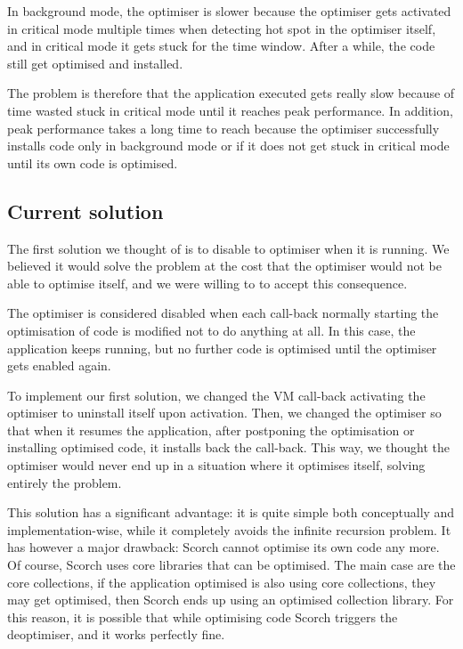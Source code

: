 \documentclass[a4paper,12pt,twoside]{../includes/ThesisStyle}
\begin{document}
In background mode, the optimiser is slower because the optimiser gets activated in critical mode multiple times when detecting hot spot in the optimiser itself, and in critical mode it gets stuck for the time window. After a while, the code still get optimised and installed. 

The problem is therefore that the application executed gets really slow because of time wasted stuck in critical mode until it reaches peak performance. In addition, peak performance takes a long time to reach because the optimiser successfully installs code only in background mode or if it does not get stuck in critical mode until its own code is optimised. 

\subsection{Current solution}

The first solution we thought of is to disable to optimiser when it is running. We believed it would solve the problem at the cost that the optimiser would not be able to optimise itself, and we were willing to to accept this consequence.

The optimiser is considered disabled when each call-back normally starting the optimisation of code is modified not to do anything at all. In this case, the application keeps running, but no further code is optimised until the optimiser gets enabled again.

To implement our first solution, we changed the VM call-back activating the optimiser to uninstall itself upon activation. Then, we changed the optimiser so that when it resumes the application, after postponing the optimisation or installing optimised code, it installs back the call-back. This way, we thought the optimiser would never end up in a situation where it optimises itself, solving entirely the problem.

This solution has a significant advantage: it is quite simple both conceptually and implementation-wise, while it completely avoids the infinite recursion problem. It has however a major drawback: Scorch cannot optimise its own code any more. Of course, Scorch uses core libraries that can be optimised. The main case are the core collections, if the application optimised is also using core collections, they may get optimised, then Scorch ends up using an optimised collection library. For this reason, it is possible that while optimising code Scorch triggers the deoptimiser, and it works perfectly fine.
\end{document}
